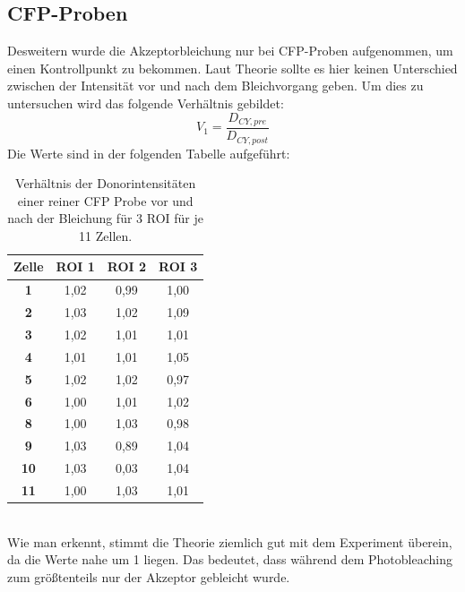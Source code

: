 \subsection{CFP-Proben}
Desweitern wurde die Akzeptorbleichung nur bei CFP-Proben aufgenommen, um einen Kontrollpunkt zu bekommen. 
Laut Theorie sollte es hier keinen Unterschied zwischen der Intensität vor und nach dem Bleichvorgang 
geben. Um dies zu untersuchen wird das folgende Verhältnis gebildet:
\begin{equation}
    V_1 = \frac{D_{CY,pre}}{D_{CY,post}}
\end{equation}
\newpage
Die Werte sind in der folgenden Tabelle aufgeführt:
\begin{table}[h]
    \centering
      \begin{tabular}{c|c|c|c}
      \textbf{Zelle} & \textbf{ROI 1} & \textbf{ROI 2} & \textbf{ROI 3} \\
      \hline
      \textbf{1} & 1,02  & 0,99  & 1,00 \\
      \textbf{2} & 1,03  & 1,02  & 1,09 \\
      \textbf{3} & 1,02  & 1,01  & 1,01 \\
      \textbf{4} & 1,01  & 1,01  & 1,05 \\
      \textbf{5} & 1,02  & 1,02  & 0,97 \\
      \textbf{6} & 1,00  & 1,01  & 1,02 \\
      \textbf{8} & 1,00  & 1,03  & 0,98 \\
      \textbf{9} & 1,03  & 0,89  & 1,04 \\
      \textbf{10} & 1,03  & 0,03  & 1,04 \\
      \textbf{11} & 1,00  & 1,03  & 1,01 \\
      \end{tabular}
      \caption{Verhältnis der Donorintensitäten einer reiner CFP Probe vor und nach der Bleichung für 3 ROI für je 11 Zellen.}
    \label{tab:Verhältnis CFP}
  \end{table}\\
  Wie man erkennt, stimmt die Theorie ziemlich gut mit dem Experiment überein, da die Werte nahe um 1 
  liegen. Das bedeutet, dass während dem Photobleaching zum größtenteils nur der Akzeptor gebleicht wurde.
